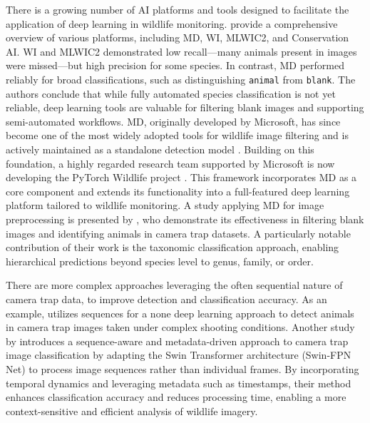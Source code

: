 There is a growing number of \ac{AI} platforms and tools designed to facilitate the application of deep learning in wildlife monitoring.
\textcite{velezChoosingAppropriatePlatform2022} provide a comprehensive overview of various platforms, including \ac{MD}, \ac{WI}, \ac{MLWIC2}, and Conservation \ac{AI}.
\ac{WI} and \ac{MLWIC2} demonstrated low recall—many animals present in images were missed—but high precision for some species.
In contrast, \ac{MD} performed reliably for broad classifications, such as distinguishing \texttt{animal} from \texttt{blank}.
The authors conclude that while fully automated species classification is not yet reliable, deep learning tools are valuable for filtering blank images and supporting semi-automated workflows.
\ac{MD}, originally developed by Microsoft, has since become one of the most widely adopted tools for wildlife image filtering and is actively maintained as a standalone detection model \autocite{morrisEfficientPipelineCamera2025}.
Building on this foundation, a highly regarded research team supported by Microsoft is now developing the PyTorch Wildlife project \autocite{hernandezPytorchWildlifeCollaborativeDeep2024}.
This framework incorporates \ac{MD} as a core component and extends its functionality into a full-featured deep learning platform tailored to wildlife monitoring.
A study applying \ac{MD} for image preprocessing is presented by \textcite{schneiderRecognitionEuropeanMammals2024}, who demonstrate its effectiveness in filtering blank images and identifying animals in camera trap datasets.
A particularly notable contribution of their work is the taxonomic classification approach, enabling hierarchical predictions beyond species level to genus, family, or order.





There are more complex approaches leveraging the often sequential nature of camera trap data, to improve detection and classification accuracy.
As an example, \textcite{zotinANIMALDETECTIONUSING2019} utilizes sequences for a none deep learning approach to detect animals in camera trap images taken under complex shooting conditions.
Another study by \textcite{muhammadTemporalSwinFPNNetNovel2024} introduces a sequence-aware and metadata-driven approach to camera trap image classification by adapting the Swin Transformer architecture (Swin-FPN Net) to process image sequences rather than individual frames. 
By incorporating temporal dynamics and leveraging metadata such as timestamps, their method enhances classification accuracy and reduces processing time, enabling a more context-sensitive and efficient analysis of wildlife imagery.
